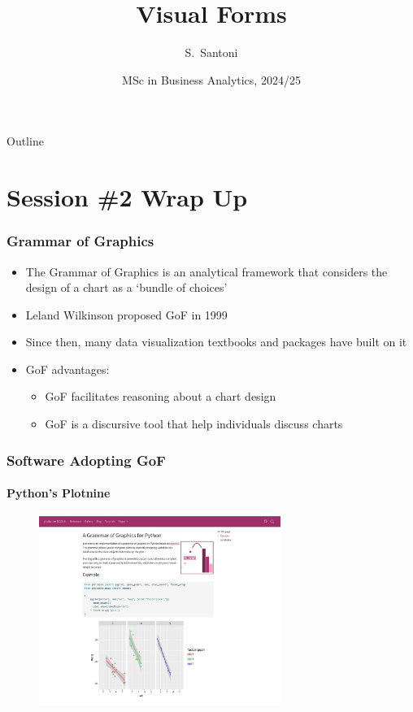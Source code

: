 \documentclass[aspectratio=1610]{beamer}
\title[Visual Forms]%
{Visual Forms}
\author{S.~Santoni\inst{1}}
\institute{
	\inst{1}%
	Bayes Business School
	}
\date{MSc in Business Analytics, 2024/25}
\begin{document}
\begin{frame}
	\titlepage
\end{frame}

\begin{frame}{Outline}
	\tableofcontents
\end{frame}

\section{Session \#2 Wrap Up}

\begin{frame}
	\frametitle{Grammar of Graphics}
	\begin{itemize}
		\item The Grammar of Graphics is an analytical framework that considers
		      the design of a chart as a `bundle of choices'
		\item Leland Wilkinson proposed GoF in 1999 \parencite{wilkinson2012grammar}
		\item Since then, many data visualization textbooks and packages have built
		      on it
		\item GoF advantages:
		      \begin{itemize}
			      \item GoF facilitates reasoning about a chart design
			      \item GoF is a discursive tool that help individuals discuss charts
		      \end{itemize}
	\end{itemize}
\end{frame}

\begin{frame}
	\frametitle{Software Adopting GoF}
	\framesubtitle{Python's Plotnine}
	\begin{figure}
		\begin{center}
			\includegraphics[width=0.7\textwidth]{figures/plotnine.png}
		\end{center}
	\end{figure}
\end{frame}
\end{document}
